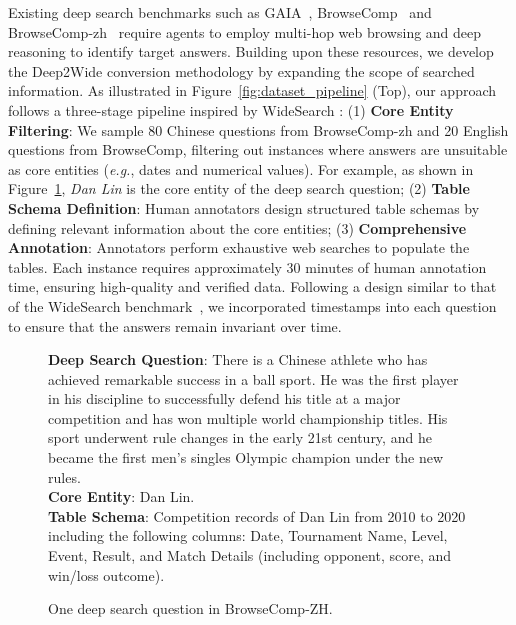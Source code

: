 \documentclass[11pt, letterpaper, logo, onecolumn, copyright, numbering]{paper_improved}
\let\cite\citep
\begin{document}
Existing deep search benchmarks such as GAIA~\cite{mialon2023gaiabenchmarkgeneralai}, BrowseComp~\cite{wei2025browsecompsimplechallengingbenchmark} and BrowseComp-zh~\cite{zhou2025browsecompzhbenchmarkingwebbrowsing} require agents to employ multi-hop web browsing and deep reasoning to identify target answers. Building upon these resources, we develop the Deep2Wide conversion methodology by expanding the scope of searched information. As illustrated in Figure~\ref{fig:dataset_pipeline} (Top), our approach follows a three-stage pipeline inspired by WideSearch \cite{wong2025widesearch}: (1) \textbf{Core Entity Filtering}: We sample 80 Chinese questions from BrowseComp-zh and 20 English questions from BrowseComp, filtering out instances where answers are unsuitable as core entities (\textit{e.g.}, dates and numerical values). For example, as shown in Figure~\ref{fig:lin_dan}, \textit{Dan Lin} is the core entity of the deep search question; 
(2) \textbf{Table Schema Definition}: Human annotators design structured table schemas by defining relevant information about the core entities; (3) \textbf{Comprehensive Annotation}: Annotators perform exhaustive web searches to populate the tables. Each instance requires approximately 30 minutes of human annotation time, ensuring high-quality and verified data.
Following a design similar to that of the WideSearch benchmark~\cite{wong2025widesearch}, we incorporated timestamps into each question to ensure that the answers remain invariant over time.

\begin{figure}[htbp]
    \begin{tcolorbox}[
        colback=yellow!10,
        colbacktitle=black!80,
        coltitle=white,
        arc=1mm,
        boxrule=0pt,
        breakable]
        \textbf{Deep Search Question}: There is a Chinese athlete who has achieved remarkable success in a ball sport. He was the first player in his discipline to successfully defend his title at a major competition and has won multiple world championship titles. His sport underwent rule changes in the early 21st century, and he became the first men's singles Olympic champion under the new rules. \\
        \textbf{Core Entity}: Dan Lin.\\
        \textbf{Table Schema}: Competition records of Dan Lin from 2010 to 2020 including the following columns: Date, Tournament Name, Level, Event, Result, and Match Details (including opponent, score, and win/loss outcome).
    \end{tcolorbox}
    \caption{One deep search question in BrowseComp-ZH.\label{fig:lin_dan}}
\end{figure}
\end{document}
